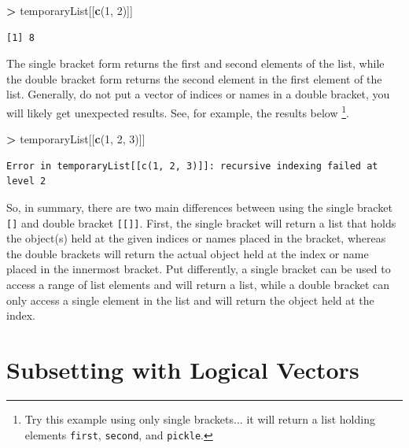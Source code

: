 \documentclass[]{krantz}
\makeatletter
\newenvironment{Shaded}{\begin{snugshade}}{\end{snugshade}}
\newcommand{\DecValTok}[1]{\textcolor[rgb]{0.06,0.06,0.06}{#1}}
\newcommand{\KeywordTok}[1]{\textcolor[rgb]{0.27,0.27,0.27}{\textbf{#1}}}
\newcommand{\NormalTok}[1]{#1}
\newcommand{\OperatorTok}[1]{\textcolor[rgb]{0.43,0.43,0.43}{\textbf{#1}}}
\newcommand{\StringTok}[1]{\textcolor[rgb]{0.5,0.5,0.5}{#1}}
\newenvironment{kframe}{%
\medskip{}
\setlength{\fboxsep}{.8em}
 \def\at@end@of@kframe{}%
 \ifinner\ifhmode%
  \def\at@end@of@kframe{\end{minipage}}%
  \begin{minipage}{\columnwidth}%
 \fi\fi%
 \def\FrameCommand##1{\hskip\@totalleftmargin \hskip-\fboxsep
 \colorbox{shadecolor}{##1}\hskip-\fboxsep
     \hskip-\linewidth \hskip-\@totalleftmargin \hskip\columnwidth}%
 \MakeFramed {\advance\hsize-\width
   \@totalleftmargin\z@ \linewidth\hsize
   \@setminipage}}%
 {\par\unskip\endMakeFramed%
 \at@end@of@kframe}
\renewenvironment{Shaded}{\begin{kframe}}{\end{kframe}}
\makeatother
\begin{document}
\begin{Shaded}
\begin{Highlighting}[]
\OperatorTok{>}\StringTok{ }\NormalTok{temporaryList[[}\KeywordTok{c}\NormalTok{(}\DecValTok{1}\NormalTok{, }\DecValTok{2}\NormalTok{)]]}
\end{Highlighting}
\end{Shaded}

\begin{verbatim}
[1] 8
\end{verbatim}

The single bracket form returns the first and second elements of the list, while the double bracket form returns the second element in the first element of the list. Generally, do not put a vector of indices or names in a double bracket, you will likely get unexpected results. See, for example, the results below \footnote{Try this example using only single brackets\(\ldots\) it will return a list holding elements \texttt{first}, \texttt{second}, and \texttt{pickle}.}.

\begin{Shaded}
\begin{Highlighting}[]
\OperatorTok{>}\StringTok{ }\NormalTok{temporaryList[[}\KeywordTok{c}\NormalTok{(}\DecValTok{1}\NormalTok{, }\DecValTok{2}\NormalTok{, }\DecValTok{3}\NormalTok{)]]}
\end{Highlighting}
\end{Shaded}

\begin{verbatim}
Error in temporaryList[[c(1, 2, 3)]]: recursive indexing failed at level 2
\end{verbatim}

So, in summary, there are two main differences between using the single bracket \texttt{{[}{]}} and double bracket \texttt{{[}{[}{]}{]}}. First, the single bracket will return a list that holds the object(s) held at the given indices or names placed in the bracket, whereas the double brackets will return the actual object held at the index or name placed in the innermost bracket. Put differently, a single bracket can be used to access a range of list elements and will return a list, while a double bracket can only access a single element in the list and will return the object held at the index.

\hypertarget{subsetting-with-logical-vectors}{%
\section{Subsetting with Logical Vectors}\label{subsetting-with-logical-vectors}}
\end{document}
